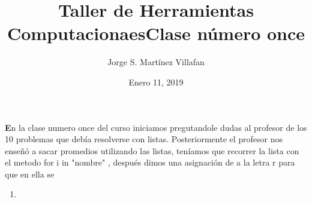 \documentclass[letterpaper, 12pt, oneside]{article}%
\title{\Huge Taller de Herramientas Computacionaes}
\author{Jorge S. Martínez Villafan}
\date{Enero 11, 2019}
\begin{document}
\maketitle
\newpage
\title{Clase número once}

\textbf En la clase numero once del curso iniciamos pregutandole dudas al profesor de los 10 problemas que debía resolverse con listas.
Posteriormente el profesor nos enseñó a sacar promedios utilizando las listas, teníamos que recorrer la lista con el metodo 	\color{blue}for i in "nombre" \color{black}, después dimos una asignación de a la letra r para que en ella se 
\begin{enumerate}
\item 
\end{enumerate}
\end{document}
